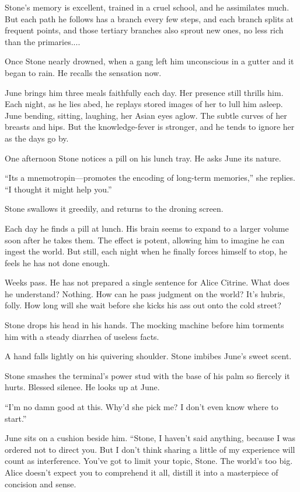 Stone’s memory is excellent, trained in a cruel school, and he assimilates much. But each path he follows has a branch every few steps, and each branch splits at frequent points, and those tertiary branches also sprout new ones, no less rich than the primaries....

Once Stone nearly drowned, when a gang left him unconscious in a gutter and it began to rain. He recalls the sensation now.

June brings him three meals faithfully each day. Her presence still thrills him. Each night, as he lies abed, he replays stored images of her to lull him asleep. June bending, sitting, laughing, her Asian eyes aglow. The subtle curves of her breasts and hips. But the knowledge-fever is stronger, and he tends to ignore her as the days go by.

One afternoon Stone notices a pill on his lunch tray. He asks June its nature.

“Its a mnemotropin—promotes the encoding of long-term memories,” she replies. “I thought it might help you.”

Stone swallows it greedily, and returns to the droning screen.

Each day he finds a pill at lunch. His brain seems to expand to a larger volume soon after he takes them. The effect is potent, allowing him to imagine he can ingest the world. But still, each night when he finally forces himself to stop, he feels he has not done enough.

Weeks pass. He has not prepared a single sentence for Alice Citrine. What does he understand? Nothing. How can he pass judgment on the world? It’s hubris, folly. How long will she wait before she kicks his ass out onto the cold street?

Stone drops his head in his hands. The mocking machine before him torments him with a steady diarrhea of useless facts.

A hand falls lightly on his quivering shoulder. Stone imbibes June’s sweet scent.

Stone smashes the terminal’s power stud with the base of his palm so fiercely it hurts. Blessed silenee. He looks up at June.

“I’m no damn good at this. Why’d she pick me? I don’t even know where to start.”

June sits on a cushion beside him. “Stone, I haven’t said anything, because I was ordered not to direct you. But I don’t think sharing a little of my experience will count as interference. You’ve got to limit your topic, Stone. The world’s too big. Alice doesn’t expect you to comprehend it all, distill it into a masterpiece of concision and sense.

